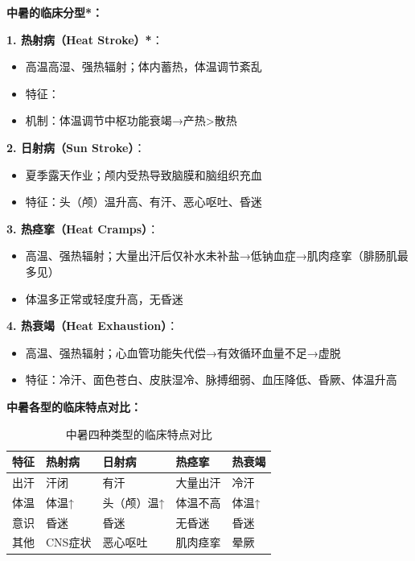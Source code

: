 \begin{keybox}
\textbf{中暑的临床分型*：}

\textbf{1. 热射病（Heat Stroke）*}：
\begin{itemize}[leftmargin=*]
    \item 高温高湿、强热辐射；体内蓄热，体温调节紊乱
    \item 特征：
    \item 机制：体温调节中枢功能衰竭→产热>散热
\end{itemize}

\textbf{2. 日射病（Sun Stroke）}：
\begin{itemize}[leftmargin=*]
    \item 夏季露天作业；颅内受热导致脑膜和脑组织充血
    \item 特征：头（颅）温升高、有汗、恶心呕吐、昏迷
\end{itemize}

\textbf{3. 热痉挛（Heat Cramps）}：
\begin{itemize}[leftmargin=*]
    \item 高温、强热辐射；大量出汗后仅补水未补盐→低钠血症→肌肉痉挛（腓肠肌最多见）
    \item 体温多正常或轻度升高，无昏迷
\end{itemize}

\textbf{4. 热衰竭（Heat Exhaustion）}：
\begin{itemize}[leftmargin=*]
    \item 高温、强热辐射；心血管功能失代偿→有效循环血量不足→虚脱
    \item 特征：冷汗、面色苍白、皮肤湿冷、脉搏细弱、血压降低、昏厥、体温升高
\end{itemize}

\textbf{中暑各型的临床特点对比：}

\begin{table}[H]
\centering
\caption{中暑四种类型的临床特点对比}
\begin{tabularx}{\textwidth}{lXXXX}
\hline
\textbf{特征} & \textbf{热射病} & \textbf{日射病} & \textbf{热痉挛} & \textbf{热衰竭} \\
\hline
出汗 & 汗闭 & 有汗 & 大量出汗 & 冷汗 \\
体温 & 体温↑ & 头（颅）温↑ & 体温不高 & 体温↑ \\
意识 & 昏迷 & 昏迷 & 无昏迷 & 昏迷 \\
其他 & CNS症状 & 恶心呕吐 & 肌肉痉挛 & 晕厥 \\
\hline
\end{tabularx}
\end{table}


\end{keybox}

